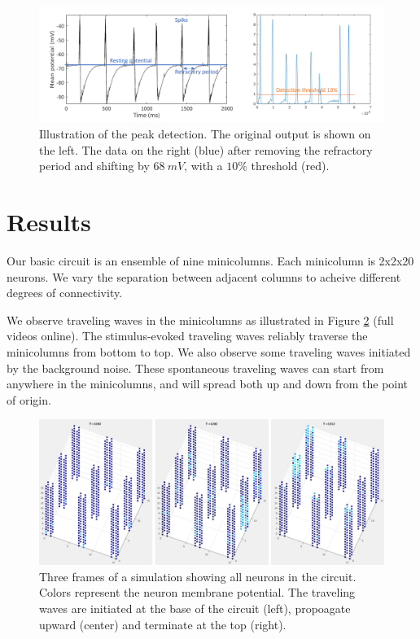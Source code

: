\documentclass[a4paper,11pt]{article}
\begin{document}
\begin{figure}[!ht]
 \caption{Illustration of the peak detection. The original output is shown on the left. The data on the right (blue) after removing the refractory period and shifting by $68\ mV$, with a $10\%$ threshold (red). }
 \label{fig:peak_det}
 \centering
   \includegraphics[width=\textwidth]{fig/PeakDetectionExample}
\end{figure}


\clearpage
\section{Results}
Our basic circuit is an ensemble of nine minicolumns. 
Each minicolumn is 2x2x20 neurons. 
We vary the separation between adjacent columns to acheive different degrees of connectivity.

We observe traveling waves in the minicolumns as illustrated in Figure \ref{fig:firing_video} (full videos online).
The stimulus-evoked traveling waves reliably traverse the minicolumns from bottom to top.
We also observe some traveling waves initiated by the background noise.
These spontaneous traveling waves can start from anywhere in the minicolumns, and will spread both up and down from the point of origin.
\begin{figure}[!ht]
 \caption{Three frames of a simulation showing all neurons in the circuit. Colors represent the neuron membrane potential. The traveling waves are initiated at the base of the circuit (left), propoagate upward (center) and terminate at the top (right).} 
 \label{fig:firing_video}
 \centering
   \includegraphics[width=\textwidth]{fig/VideoStills}
\end{figure}
\end{document}
